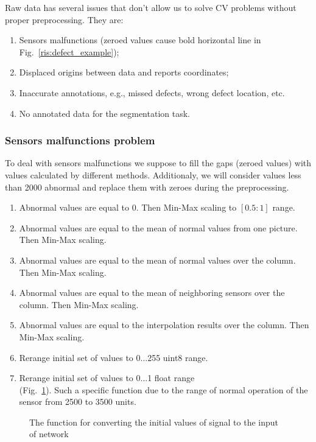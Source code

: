 Raw data has several issues that don't allow us to solve CV problems without proper preprocessing.
They are:
\begin{enumerate}
	\item Sensors malfunctions (zeroed values cause bold horizontal line in Fig.~\ref{ris:defect_example});
	\item Displaced origins between data and reports coordinates;
	\item Inaccurate annotations, e.g., missed defects, wrong defect location, etc.
	\item No annotated data for the segmentation task.
\end{enumerate}

\subsubsection{Sensors malfunctions problem}
To deal with sensors malfunctions we suppose to fill the gaps (zeroed values) with values calculated by different methods.
Additionaly, we will consider values less than 2000 abnormal and replace them with zeroes during the preprocessing.
\begin{enumerate}
	\item Abnormal values are equal to 0. Then Min-Max scaling to $[0.5:1]$ range.
	\item Abnormal values are equal to the mean of normal values from one picture. Then Min-Max scaling.
	\item Abnormal values are equal to the mean of normal values over the column. Then Min-Max scaling.
	\item Abnormal values are equal to the mean of neighboring sensors over the column. Then Min-Max scaling.
	\item Abnormal values are equal to the interpolation results over the column. Then Min-Max scaling.
	\item Rerange initial set of values to 0...255 uint8 range.
	\item Rerange initial set of values to 0...1 float range \\ 
	(Fig.~\ref{ris:preproc_fun}). Such a specific function due to the range of normal operation of the sensor from 2500 to 3500 units.
\end{enumerate}

\begin{figure}[ht]
	\caption{The function for converting the initial values of signal to the input of network}
	\label{ris:preproc_fun}
\end{figure}

